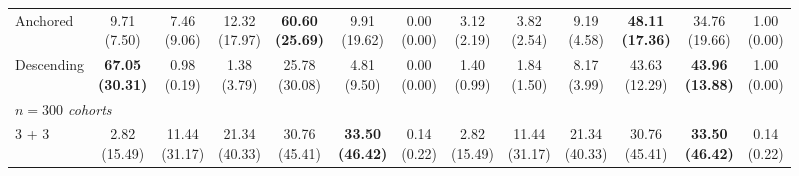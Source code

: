 {\begin{tabular}{l|cccccc|cccccc}
Anchored & \makecell{9.71 \\ (7.50)} & \makecell{7.46 \\ (9.06)} & \makecell{12.32 \\ (17.97)} & {\cellcolor[HTML]{C8E6C9}} \bfseries \makecell{60.60 \\ (25.69)} & \makecell{9.91 \\ (19.62)} & \makecell{0.00 \\ (0.00)} & \makecell{3.12 \\ (2.19)} & \makecell{3.82 \\ (2.54)} & \makecell{9.19 \\ (4.58)} & {\cellcolor[HTML]{C8E6C9}} \bfseries \makecell{48.11 \\ (17.36)} & \makecell{34.76 \\ (19.66)} & \makecell{1.00 \\ (0.00)} \\
Descending & \bfseries \makecell{67.05 \\ (30.31)} & \makecell{0.98 \\ (0.19)} & \makecell{1.38 \\ (3.79)} & {\cellcolor[HTML]{C8E6C9}} \makecell{25.78 \\ (30.08)} & \makecell{4.81 \\ (9.50)} & \makecell{0.00 \\ (0.00)} & \makecell{1.40 \\ (0.99)} & \makecell{1.84 \\ (1.50)} & \makecell{8.17 \\ (3.99)} & {\cellcolor[HTML]{C8E6C9}} \makecell{43.63 \\ (12.29)} & \bfseries \makecell{43.96 \\ (13.88)} & \makecell{1.00 \\ (0.00)} \\
\midrule
\multicolumn{13}{l}{\emph{$n = 300$ cohorts}} \\
3 + 3 & \makecell{2.82 \\ (15.49)} & \makecell{11.44 \\ (31.17)} & \makecell{21.34 \\ (40.33)} & {\cellcolor[HTML]{C8E6C9}} \makecell{30.76 \\ (45.41)} & \bfseries \makecell{33.50 \\ (46.42)} & \makecell{0.14 \\ (0.22)} & \makecell{2.82 \\ (15.49)} & \makecell{11.44 \\ (31.17)} & \makecell{21.34 \\ (40.33)} & {\cellcolor[HTML]{C8E6C9}} \makecell{30.76 \\ (45.41)} & \bfseries \makecell{33.50 \\ (46.42)} & \makecell{0.14 \\ (0.22)} \\

\end{tabular}}
